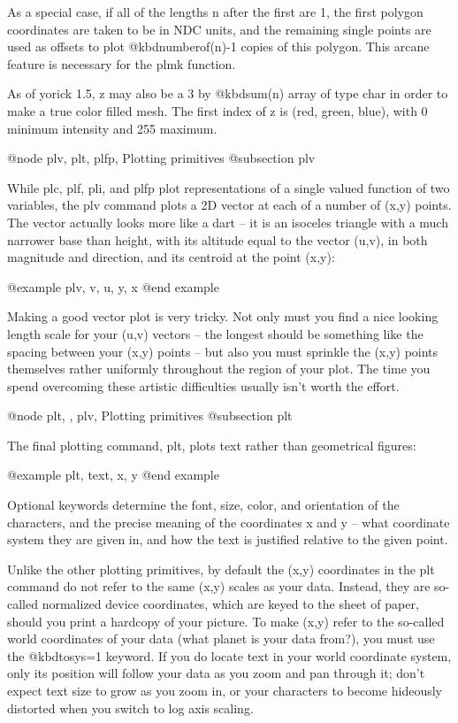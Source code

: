 As a special case, if all of the lengths n after the first are 1, the
first polygon coordinates are taken to be in NDC units, and the
remaining single points are used as offsets to plot @kbd{numberof(n)-1}
copies of this polygon.  This arcane feature is necessary for the plmk
function.

As of yorick 1.5, z may also be a 3 by @kbd{sum(n)} array of type char
in order to make a true color filled mesh.  The first index of z is
(red, green, blue), with 0 minimum intensity and 255 maximum.

@node plv, plt, plfp, Plotting primitives
@subsection plv

While plc, plf, pli, and plfp plot representations of a single valued
function of two variables, the plv command plots a 2D vector at each
of a number of (x,y) points.  The vector actually looks more like a
dart -- it is an isoceles triangle with a much narrower base than
height, with its altitude equal to the vector (u,v), in both magnitude
and direction, and its centroid at the point (x,y):

@example
plv, v, u, y, x
@end example

Making a good vector plot is very tricky.  Not only must you find a
nice looking length scale for your (u,v) vectors -- the longest should
be something like the spacing between your (x,y) points -- but also
you must sprinkle the (x,y) points themselves rather uniformly
throughout the region of your plot.  The time you spend overcoming
these artistic difficulties usually isn't worth the effort.

@node plt,  , plv, Plotting primitives
@subsection plt

The final plotting command, plt, plots text rather than geometrical
figures:

@example
plt, text, x, y
@end example

Optional keywords determine the font, size, color, and orientation of
the characters, and the precise meaning of the coordinates x and y --
what coordinate system they are given in, and how the text is justified
relative to the given point.

Unlike the other plotting primitives, by default the (x,y) coordinates
in the plt command do not refer to the same (x,y) scales as your data.
Instead, they are so-called normalized device coordinates, which are
keyed to the sheet of paper, should you print a hardcopy of your
picture.  To make (x,y) refer to the so-called world coordinates of
your data (what planet is your data from?), you must use the @kbd{tosys=1}
keyword.  If you do locate text in your world coordinate system, only
its position will follow your data as you zoom and pan through it;
don't expect text size to grow as you zoom in, or your characters to
become hideously distorted when you switch to log axis scaling.

